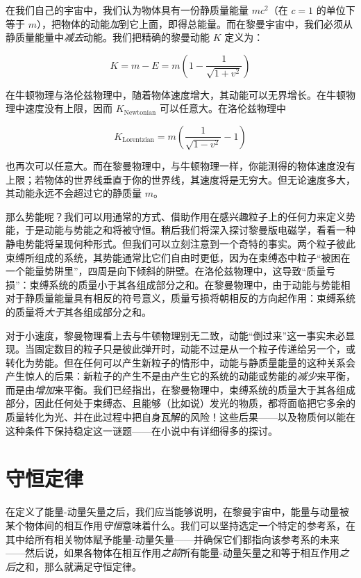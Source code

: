 在我们自己的宇宙中，我们认为物体具有一份静质量能量 $mc^{2}$（在 $c=1$ 的单位下等于 $m$），把物体的动能\emph{加}到它上面，即得总能量。而在黎曼宇宙中，我们必须从静质量能量中\emph{减去}动能。我们把精确的黎曼动能 $K$ 定义为：

\begin{equation}
K = m - E = m\left(1 - \frac{1}{\sqrt{1+v^{2}}}\right)
\end{equation}

在牛顿物理与洛伦兹物理中，随着物体速度增大，其动能可以无界增长。在牛顿物理中速度没有上限，因而 $K_{\text{Newtonian}}$ 可以任意大。在洛伦兹物理中

\begin{equation}
K_{\text{Lorentzian}} = m\left(\frac{1}{\sqrt{1-v^{2}}} - 1\right)
\end{equation}

也再次可以任意大。而在黎曼物理中，与牛顿物理一样，你能测得的物体速度没有上限；若物体的世界线垂直于你的世界线，其速度将是无穷大。但无论速度多大，其动能永远不会超过它的静质量 $m$。

那么势能呢？我们可以用通常的方式、借助作用在感兴趣粒子上的任何力来定义势能，于是动能与势能之和将被守恒。稍后我们将深入探讨黎曼版电磁学，看看一种静电势能将呈现何种形式。但我们可以立刻注意到一个奇特的事实。两个粒子彼此束缚所组成的系统，其势能通常比它们自由时更低，因为在束缚态中粒子“被困在一个能量势阱里”，四周是向下倾斜的阱壁。在洛伦兹物理中，这导致“质量亏损”：束缚系统的质量小于其各组成部分之和。在黎曼物理中，由于动能与势能相对于静质量能量具有相反的符号意义，质量亏损将朝相反的方向起作用：束缚系统的质量将\emph{大于}其各组成部分之和。

对于小速度，黎曼物理看上去与牛顿物理别无二致，动能“倒过来”这一事实未必显现。当固定数目的粒子只是彼此弹开时，动能不过是从一个粒子传递给另一个，或转化为势能。但在任何可以产生新粒子的情形中，动能与静质量能量的这种关系会产生惊人的后果：新粒子的产生不是由产生它的系统的动能或势能的\emph{减少}来平衡，而是由\emph{增加}来平衡。我们已经指出，在黎曼物理中，束缚系统的质量大于其各组成部分，因此任何处于束缚态、且能够（比如说）发光的物质，都将面临把它多余的质量转化为光、并在此过程中把自身瓦解的风险！这些后果——以及物质何以能在这种条件下保持稳定这一谜题——在小说中有详细得多的探讨。

\section{守恒定律}

在定义了能量-动量矢量之后，我们应当能够说明，在黎曼宇宙中，能量与动量被某个物体间的相互作用\emph{守恒}意味着什么。我们可以坚持选定一个特定的参考系，在其中给所有相关物体赋予能量-动量矢量——并确保它们都指向该参考系的未来——然后说，如果各物体在相互作用\emph{之前}所有能量-动量矢量之和等于相互作用\emph{之后}之和，那么就满足守恒定律。

